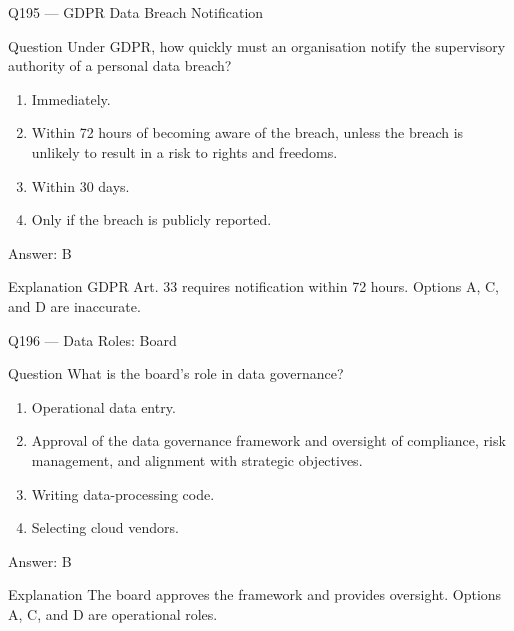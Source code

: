 \documentclass[aspectratio=169,8pt]{beamer}
\begin{document}
			\begin{frame}{Q195 --- GDPR Data Breach Notification}
				\begin{block}{Question}
					Under GDPR, how quickly must an organisation notify the supervisory authority of a personal data breach?
					\begin{enumerate}
						\item Immediately.
						\item Within 72 hours of becoming aware of the breach, unless the breach is unlikely to result in a risk to rights and freedoms.
						\item Within 30 days.
						\item Only if the breach is publicly reported.
					\end{enumerate}  \end{block}
					\begin{exampleblock}{Answer: B}\end{exampleblock}
					\begin{block}{Explanation}
						GDPR Art. 33 requires notification within 72 hours. Options A, C, and D are inaccurate.
					\end{block}
				\end{frame}
				
				\begin{frame}{Q196 --- Data Roles: Board}
					\begin{block}{Question}
						What is the board's role in data governance?
						\begin{enumerate}
							\item Operational data entry.
							\item Approval of the data governance framework and oversight of compliance, risk management, and alignment with strategic objectives.
							\item Writing data-processing code.
							\item Selecting cloud vendors.
						\end{enumerate}  \end{block}
						\begin{exampleblock}{Answer: B}\end{exampleblock}
						\begin{block}{Explanation}
							The board approves the framework and provides oversight. Options A, C, and D are operational roles.
						\end{block}
					\end{frame}
					
\end{document}
